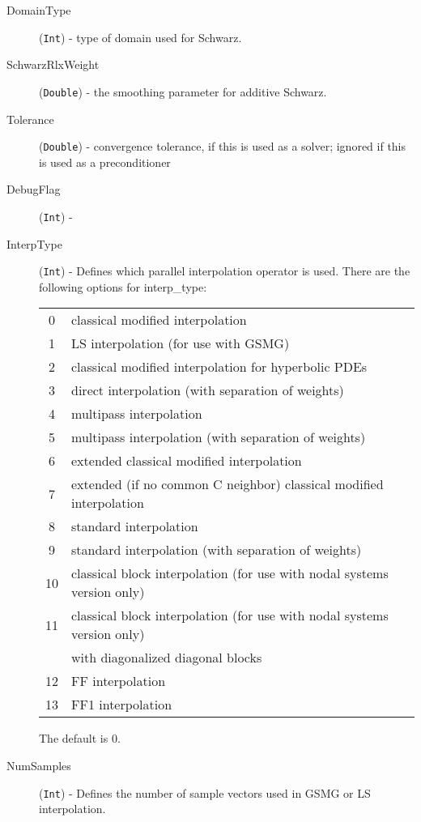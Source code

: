 \documentclass{article}
\begin{document}
\begin{cxxentry}
\begin{cxxentry}
\begin{cxxvariable}
\begin{cxxdoc}
\begin{description}
\item[DomainType] ({\tt Int}) - type of domain used for Schwarz.

\item[SchwarzRlxWeight] ({\tt Double}) - the smoothing parameter
for additive Schwarz.

\item[Tolerance] ({\tt Double}) - convergence tolerance, if this
is used as a solver; ignored if this is used as a preconditioner

\item[DebugFlag] ({\tt Int}) -

\item[InterpType] ({\tt Int}) - Defines which parallel interpolation
operator is used. There are the following options for interp\_type: 

\begin{tabular}{|c|l|} \hline
0 &	classical modified interpolation \\
1 &	LS interpolation (for use with GSMG) \\
2 &	classical modified interpolation for hyperbolic PDEs \\
3 &	direct interpolation (with separation of weights) \\
4 &	multipass interpolation \\
5 &	multipass interpolation (with separation of weights) \\
6 &  extended classical modified interpolation \\
7 &  extended (if no common C neighbor) classical modified interpolation \\
8 &	standard interpolation \\
9 &	standard interpolation (with separation of weights) \\
10 &	classical block interpolation (for use with nodal systems version only) \\
11 &	classical block interpolation (for use with nodal systems version only) \\
&	with diagonalized diagonal blocks \\
12 &	FF interpolation \\
13 &	FF1 interpolation \\
\hline
\end{tabular}

The default is 0. 

\item[NumSamples] ({\tt Int}) - Defines the number of sample vectors used
in GSMG or LS interpolation.


\end{description}
\end{cxxdoc}
\end{cxxvariable}
\end{cxxentry}
\end{cxxentry}
\end{document}
